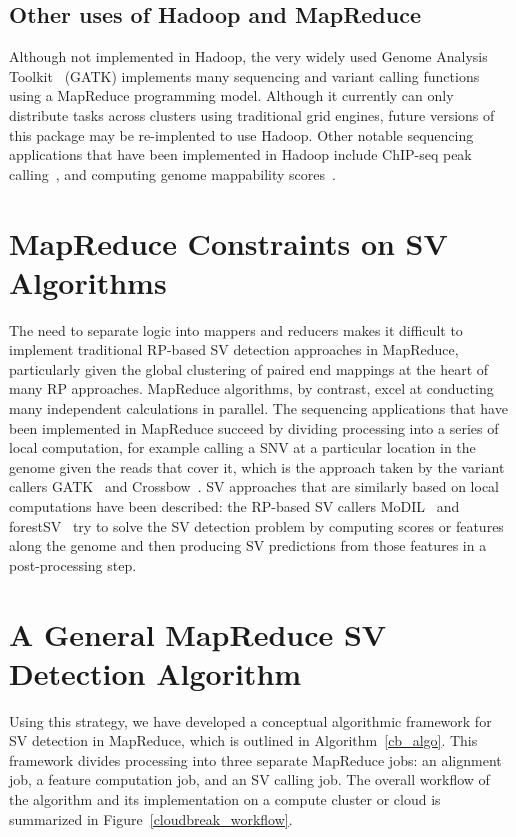 \subsection{Other uses of Hadoop and MapReduce}

Although not implemented in Hadoop, the very widely used Genome Analysis Toolkit~\cite{McKenna:2010p1051} (GATK) implements many sequencing and variant calling functions using a MapReduce programming model. Although it currently can only distribute tasks across clusters using traditional grid engines, future versions of this package may be re-implented to use Hadoop. Other notable sequencing applications that have been implemented in Hadoop include ChIP-seq peak calling~\cite{Feng:2011p1228}, and computing genome mappability scores~\cite{Lee:2012bk}. 

\section{MapReduce Constraints on SV Algorithms}

The need to separate logic into mappers and reducers makes it difficult to implement traditional RP-based SV detection approaches in MapReduce, particularly given the global clustering of paired end mappings at the heart of many RP approaches. MapReduce algorithms, by contrast, excel at conducting many independent calculations in parallel. The sequencing applications that have been implemented in MapReduce succeed by dividing processing into a series of local computation, for example calling a SNV at a particular location in the genome given the reads that cover it, which is the approach taken by the variant callers GATK~\cite{McKenna:2010p1051} and Crossbow~\cite{Langmead:2009p1225}. SV approaches that are similarly based on local computations have been described: the RP-based SV callers MoDIL~\cite{Lee:2009da} and forestSV~\cite{Michaelson:2012fj} try to solve the SV detection problem by computing scores or features along the genome and then producing SV predictions from those features in a post-processing step. 

\section{A General MapReduce SV Detection Algorithm}\label{section_general_algo}

Using this strategy, we have developed a conceptual algorithmic framework for SV detection in MapReduce, which is outlined in Algorithm~\ref{cb_algo}. This framework divides processing into three separate MapReduce jobs: an alignment job, a feature computation job, and an SV calling job. The overall workflow of the algorithm and its implementation on a compute cluster or cloud is summarized in Figure~\ref{cloudbreak_workflow}.

